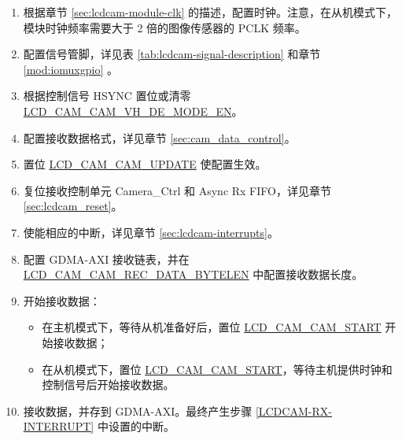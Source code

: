 \documentclass[main\_\_CN.tex]{subfiles}
\begin{document}
\begin{enumerate}
    \item 根据章节 \ref{sec:lcdcam-module-clk} 的描述，配置时钟。注意，在从机模式下，模块时钟频率需要大于 2 倍的图像传感器的 PCLK 频率。

    \item 配置信号管脚，详见表 \ref{tab:lcdcam-signal-description} 和章节 \ref{mod:iomuxgpio} \textit{}。

    \item 根据控制信号 HSYNC 置位或清零 \hyperref[fielddesc:LCDCAMCAMVHDEMODEEN]{LCD\_CAM\_CAM\_VH\_DE\_MODE\_EN}。

    \item 配置接收数据格式，详见章节 \ref{sec:cam_data_control}。

    \item 置位 \hyperref[fielddesc:LCDCAMCAMUPDATE]{LCD\_CAM\_CAM\_UPDATE} 使配置生效。

    \item 复位接收控制单元 Camera\_Ctrl 和 Async Rx FIFO，详见章节 \ref{sec:lcdcam_reset}。

    \item 使能相应的中断，详见章节 \ref{sec:lcdcam-interrupts}。\label{LCDCAM-RX-INTERRUPT}

    \item 配置 GDMA-AXI 接收链表，并在 \hyperref[fielddesc:LCDCAMCAMRECDATABYTELEN]{LCD\_CAM\_CAM\_REC\_DATA\_BYTELEN} 中配置接收数据长度。

    \item 开始接收数据：
    \begin{itemize}
        \item 在主机模式下，等待从机准备好后，置位 \hyperref[fielddesc:LCDCAMCAMSTART]{LCD\_CAM\_CAM\_START} 开始接收数据；
        \item 在从机模式下，置位 \hyperref[fielddesc:LCDCAMCAMSTART]{LCD\_CAM\_CAM\_START}，等待主机提供时钟和控制信号后开始接收数据。
    \end{itemize}
    \item 接收数据，并存到 GDMA-AXI。最终产生步骤 \ref{LCDCAM-RX-INTERRUPT} 中设置的中断。
\end{enumerate}
\end{document}
